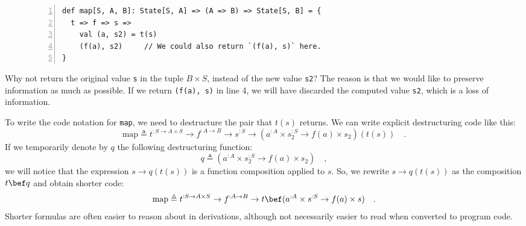 \begin{wrapfigure}{l}{0.62\columnwidth}%
\vspace{-0.9\baselineskip}
\begin{lstlisting}[numbers=left]
def map[S, A, B]: State[S, A] => (A => B) => State[S, B] = {
  t => f => s =>
    val (a, s2) = t(s)
    (f(a), s2)     // We could also return `(f(a), s)` here.
}
\end{lstlisting}
\vspace{-1.25\baselineskip}
\end{wrapfigure}%

\noindent Why not return the original value \lstinline!s! in the
tuple $B\times S$, instead of the new value \lstinline!s2!? The
reason is that we would like to preserve information as much as possible.
If we return \lstinline!(f(a), s)! in line 4, we will have discarded
the computed value \lstinline!s2!, which is a loss of information.

To write the code notation for \lstinline!map!, we need to destructure
the pair that $t(s)$ returns. We can write explicit destructuring
code like this:
\[
\text{map}\triangleq t^{:S\rightarrow A\times S}\rightarrow f^{:A\rightarrow B}\rightarrow s^{:S}\rightarrow(a^{:A}\times s_{2}^{:S}\rightarrow f(a)\times s_{2})(t(s))\quad.
\]
If we temporarily denote by $q$ the following destructuring function:
\[
q\triangleq(a^{:A}\times s_{2}^{:S}\rightarrow f(a)\times s_{2})\quad,
\]
we will notice that the expression $s\rightarrow q(t(s))$ is a function
composition applied to $s$. So, we rewrite $s\rightarrow q(t(s))$
as the composition $t\bef q$ and obtain shorter code:
\[
\text{map}\triangleq t^{:S\rightarrow A\times S}\rightarrow f^{:A\rightarrow B}\rightarrow t\bef(a^{:A}\times s^{:S}\rightarrow f(a)\times s)\quad.
\]
Shorter formulas are often easier to reason about in derivations,
although not necessarily easier to read when converted to program
code.

